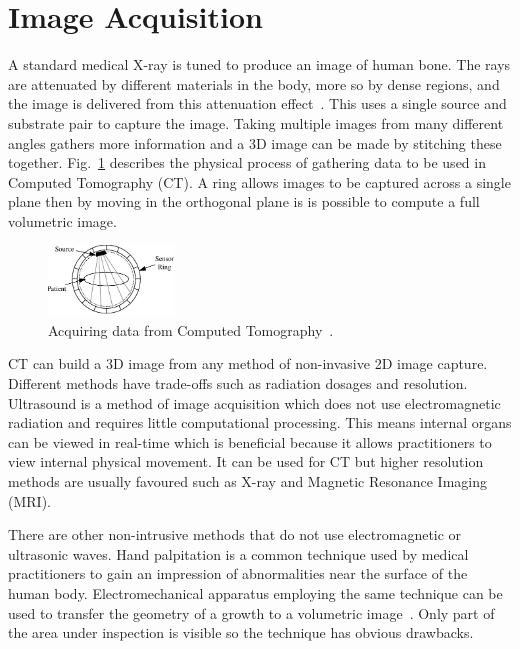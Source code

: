 \documentclass[journal]{IEEEtran}
\begin{document}
\section{Image Acquisition}
\label{sec:image}

A standard medical X-ray is tuned to produce an image of human bone.
The rays are attenuated by different materials in the body, more so by dense regions, and the image is delivered from this attenuation effect~\cite{kayvan2006biomedical}. 
This uses a single source and substrate pair to capture the image.
Taking multiple images from many different angles gathers more information and a 3D image can be made by stitching these together.
Fig.~\ref{fig:ct} describes the physical process of gathering data to be used in Computed Tomography (CT).
A ring allows images to be captured across a single plane then by moving in the orthogonal plane is is possible to compute a full volumetric image. 

\begin{figure}[!htb]
   \centering
   \includegraphics[width = 0.3\textwidth]{Figures/CT.pdf}
   \caption{Acquiring data from Computed Tomography~\cite{kayvan2006biomedical}.}
   \label{fig:ct}
\end{figure}

CT can build a 3D image from any method of non-invasive 2D image capture.
Different methods have trade-offs such as radiation dosages and resolution.
Ultrasound is a method of image acquisition which does not use electromagnetic radiation and requires little computational processing. 
This means internal organs can be viewed in real-time which is beneficial because it allows practitioners to view internal physical movement. 
It can be used for CT but higher resolution methods are usually favoured such as X-ray and Magnetic Resonance Imaging (MRI).

There are other non-intrusive methods that do not use electromagnetic or ultrasonic waves.
Hand palpitation is a common technique used by medical practitioners to gain an impression of abnormalities near the surface of the human body. 
Electromechanical apparatus employing the same technique can be used to transfer the geometry of a growth to a volumetric image~\cite{liu09haptic,wellman1997modeling}.  
Only part of the area under inspection is visible so the technique has obvious drawbacks.
\end{document}
